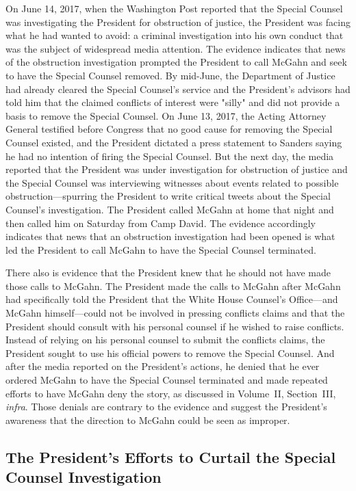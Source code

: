 {On June 14, 2017, when the Washington Post reported that the Special Counsel was investigating the President for obstruction of justice, the President was facing what he had wanted to avoid: a criminal investigation into his own conduct that was the subject of widespread media attention.
The evidence indicates that news of the obstruction investigation prompted the President to call McGahn and seek to have the Special Counsel removed.
By mid-June, the Department of Justice had already cleared the Special Counsel's service and the President's advisors had told him that the claimed conflicts of interest were "silly" and did not provide a basis to remove the Special Counsel.
On June 13, 2017, the Acting Attorney General testified before Congress that no good cause for removing the Special Counsel existed, and the President dictated a press statement to Sanders saying he had no intention of firing the Special Counsel.
But the next day, the media reported that the President was under investigation for obstruction of justice and the Special Counsel was interviewing witnesses about events related to possible obstruction---spurring the President to write critical tweets about the Special Counsel's investigation.
The President called McGahn at home that night and then called him on Saturday from Camp David.
The evidence accordingly indicates that news that an obstruction investigation had been opened is what led the President to call McGahn to have the Special Counsel terminated.

There also is evidence that the President knew that he should not have made those calls to McGahn.
The President made the calls to McGahn after McGahn had specifically told the President that the White House Counsel's Office---and McGahn himself---could not be involved in pressing conflicts claims and that the President should consult with his personal counsel if he wished to raise conflicts.
Instead of relying on his personal counsel to submit the conflicts claims, the President sought to use his official powers to remove the Special Counsel.
And after the media reported on the President's actions, he denied that he ever ordered McGahn to have the Special Counsel terminated and made repeated efforts to have McGahn deny the story, as discussed in Volume~II, Section~III, \textit{infra}.
Those denials are contrary to the evidence and suggest the President's awareness that the direction to McGahn could be seen as improper.

\subsection{The President's Efforts to Curtail the Special Counsel Investigation}

}
